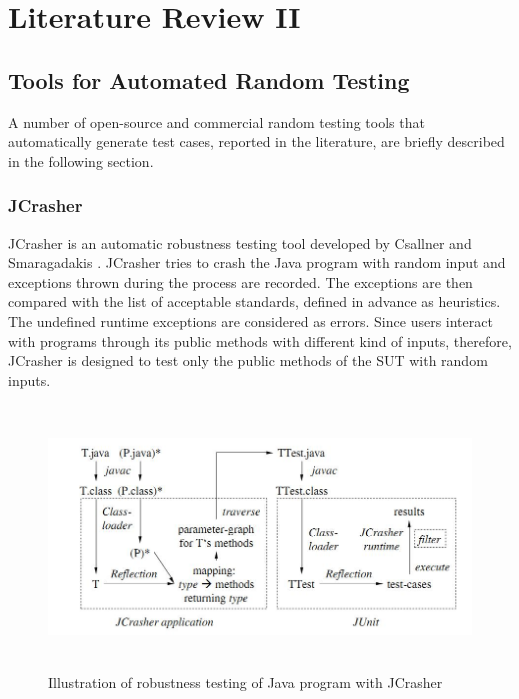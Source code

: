 \chapter{Literature Review II}
\label{chap:literature}



\section{Tools for Automated Random Testing}
A number of open-source and commercial random testing tools that automatically generate test cases, reported in the literature, are briefly described in the following section.


\subsection{JCrasher}
JCrasher is an automatic robustness testing tool developed by Csallner and Smaragadakis \cite{Pacheco2007b}. JCrasher tries to crash the Java program with random input and exceptions thrown during the process are recorded. The exceptions are then compared with the list of acceptable standards, defined in advance as heuristics. The undefined runtime exceptions are considered as errors. Since users interact with programs through its public methods with different kind of inputs, therefore, JCrasher is designed to test only the public methods of the SUT with random inputs.

\begin{figure}[h]
	\centering
	\includegraphics[width=15cm, height=7cm]{chapter3/JCrasher.png}
	\caption{Illustration of robustness testing of Java program with JCrasher~\cite{Pacheco2007b}}
	\label{fig:JCrasher}
\end{figure}

